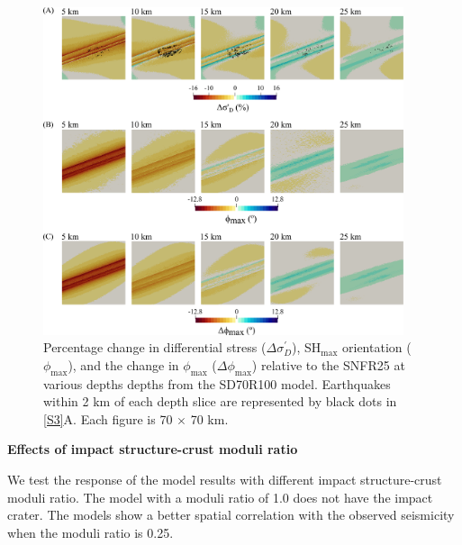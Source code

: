 \documentclass[draft,jgrga]{agutexSI2019}
\begin{document}
\begin{article}
\begin{figure}
\includegraphics[width=25pc]{Figures/SD70R100_S1.png}
\caption{Percentage change in differential stress ($\Delta\sigma_{D}^{\prime}$), SH$_{\max}$ orientation ($\phi_{\max}$), and the change in $\phi_{\max}$ ($\Delta\phi_{\max}$) relative to the SNFR25 at various depths depths from the SD70R100 model. Earthquakes within 2 km of each depth slice are represented by black dots in \ref{S3}A. Each figure is 70 $\times$ 70 km.}
\label{S5}
\end{figure}

\vspace{10mm} %


\noindent\textbf{Effects of impact structure-crust moduli ratio}

We test the response of the model results with different impact structure-crust moduli ratio. The model with a moduli ratio of 1.0 does not have the impact crater. The models show a better spatial correlation with the observed seismicity when the moduli ratio is 0.25. 

\vspace{10mm} %


\end{article}
\end{document}
